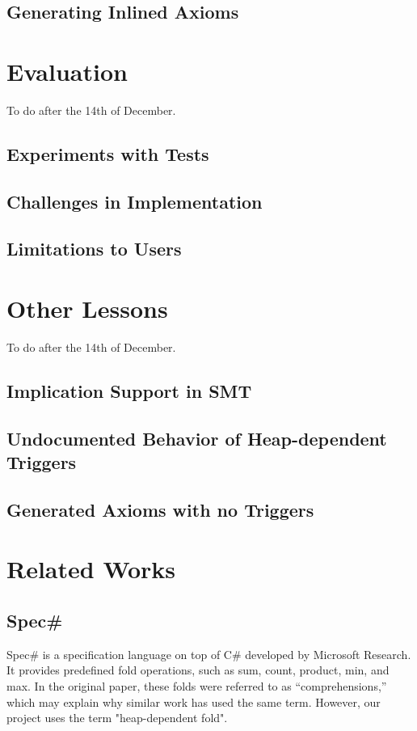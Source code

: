 \documentclass[msc,oneside]{ubcthesis}
\theoremstyle{definition}
\begin{document}
\section{Generating Inlined Axioms}

\chapter{Evaluation}
To do after the 14th of December. 

\section{Experiments with Tests}

\section{Challenges in Implementation}

\section{Limitations to Users}

\chapter{Other Lessons}
To do after the 14th of December. 

\section{Implication Support in SMT}

\section{Undocumented Behavior of Heap-dependent Triggers}

\section{Generated Axioms with no Triggers}

\chapter{Related Works}
	

\section{Spec\#}
Spec\# is a specification language on top of C\# developed by Microsoft Research. It provides predefined fold operations, such as sum, count, product, min, and max. In the original paper, these folds were referred to as ``comprehensions,'' which may explain why similar work has used the same term. However, our project uses the term "heap-dependent fold".
\end{document}
